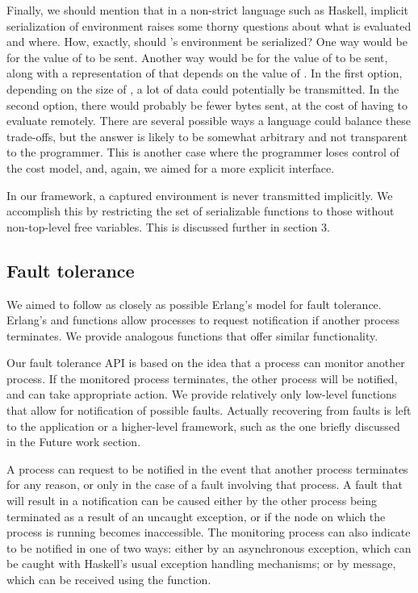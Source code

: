 \documentclass[preprint]{sigplanconf}
\begin{document}
Finally, we should mention that in a non-strict language such as Haskell, implicit serialization of environment raises some thorny questions about what is evaluated and where. How, exactly, should 's environment be serialized? One way would be for the value of  to be sent. Another way would be for the value of  to be sent, along with a representation of  that depends on the value of . In the first option, depending on the size of , a lot of data could potentially be transmitted. In the second option, there would probably be fewer bytes sent, at the cost of having to evaluate  remotely. There are several possible ways a language could balance these trade-offs, but the answer is likely to be somewhat arbitrary and not transparent to the programmer. This is another case where the programmer loses control of the cost model, and, again, we aimed for a more explicit interface.

In our framework, a captured environment is never transmitted implicitly. We accomplish this by restricting the set of serializable functions to those without non-top-level free variables. This is discussed further in section 3.

\subsection{Fault tolerance}
\label{FaultTolerance}
We aimed to follow as closely as possible Erlang's model for fault tolerance. Erlang's  and  functions allow processes to request notification if another process terminates. We provide analogous functions that offer similar functionality.

Our fault tolerance API is based on the idea that a process can monitor another process. If the monitored process terminates, the other process will be notified, and can take appropriate action. We provide relatively only low-level functions that allow for notification of possible faults. Actually recovering from faults is left to the application or a higher-level framework, such as the one briefly discussed in the Future work section.

A process can request to be notified in the event that another process terminates for any reason, or only in the case of a fault involving that process. A fault that will result in a notification can be caused either by the other process being terminated as a result of an uncaught exception, or if the node on which the process is running becomes inaccessible. The monitoring process can also indicate to be notified in one of two ways: either by an asynchronous exception, which can be caught with Haskell's usual exception handling mechanisms; or by message, which can be received using the  function.
\end{document}
